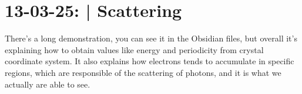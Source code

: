 \section{13-03-25: | Scattering}

There's a long demonstration, you can see it in the Obsidian files, but overall it's explaining how to obtain values like energy and periodicity from crystal coordinate system.
It also explains how electrons tends to accumulate in specific regions, which are responsible of the scattering of photons, and it is what we actually are able to see.